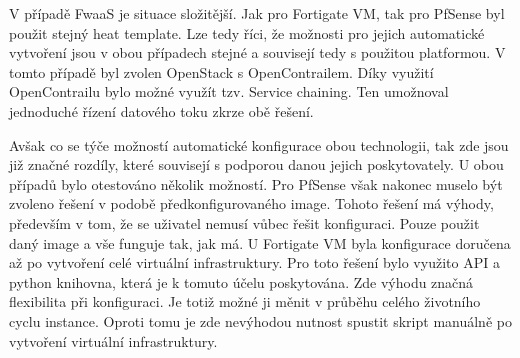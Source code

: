 V případě FwaaS je situace složitější. Jak pro Fortigate VM, tak pro PfSense byl použit stejný heat template. Lze tedy říci, že možnosti pro jejich automatické vytvoření jsou v obou případech stejné a souvisejí tedy s použitou platformou. V tomto případě byl zvolen OpenStack s OpenContrailem. Díky využití OpenContrailu bylo možné využít tzv. Service chaining. Ten umožnoval jednoduché řízení datového toku zkrze obě řešení. 

Avšak co se týče možností automatické konfigurace obou technologii, tak zde jsou již značné rozdíly, které souvisejí s podporou danou jejich poskytovately. U obou případů bylo otestováno několik možností. Pro PfSense však nakonec muselo být zvoleno řešení v podobě předkonfigurovaného image. Tohoto řešení má výhody, především v tom, že se uživatel nemusí vůbec řešit konfiguraci. Pouze použit daný image a vše funguje tak, jak má. U Fortigate VM byla konfigurace doručena až po vytvoření celé virtuální infrastruktury. Pro toto řešení bylo využito API a python knihovna, která je k tomuto účelu poskytována. Zde výhodu značná flexibilita při konfiguraci. Je totiž možné ji měnit v průběhu celého životního cyclu instance. Oproti tomu je zde nevýhodou nutnost spustit skript manuálně po vytvoření virtuální infrastruktury.

